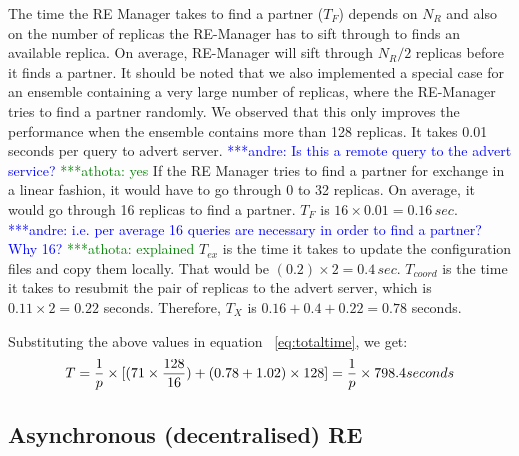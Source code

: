 \documentclass{rspublic}
\newcommand{\alnote}[1]{ {\textcolor{blue} { ***andre: #1 }}}
\newcommand{\athotanote}[1]{ {\textcolor{green} { ***athota: #1 }}}
\newcommand{\alnote}[1]{}
\newcommand{\athotanote}[1]{}
\begin{document}
The time the RE Manager takes to find a partner ($T_F$) depends on
$N_R$ and also on the number of replicas the RE-Manager has to sift
through to finds an available replica. On average, RE-Manager will
sift through $N_R/2$ replicas before it finds a partner. %
It should be noted that we also implemented a
special case for an ensemble containing a very large number of
replicas, where the RE-Manager tries to find a partner randomly. We
observed that this only improves the performance when the ensemble
contains more than 128 replicas. It takes 0.01 seconds per
query to advert server. \alnote{Is this a remote query to the advert service?} \athotanote{yes}  If the RE Manager tries to find a partner for exchange in a linear fashion, it would have to go through 0 to 32 replicas. On average, it would go through 16 replicas to find a partner. $T_F$ is $16\times
0.01=0.16\,sec$. \alnote{i.e. per average 16 queries are necessary in
  order to find a partner? Why 16?} \athotanote{explained} $T_{ex}$ is the time it takes to
update the configuration files and copy them locally. That would be
$({0.2})\times 2=0.4\,sec$. $T_{coord}$ is the time it takes to
resubmit the pair of replicas to the advert server, which is
$0.11\times 2 = 0.22$ seconds. Therefore, $T_{X}$ is
$0.16+0.4+0.22=0.78$ seconds. 



Substituting the above values in equation ~\ref{eq:totaltime}, we get:
\begin{eqnarray}
T=  {1 \over p} \times {[ {(71\times {128\over 16}}) + (0.78 + 1.02)\times 128]} = {1 \over p} \times 798.4 seconds
\label{eq:cent}
\end{eqnarray}


\subsection{Asynchronous (decentralised) RE}
\end{document}
